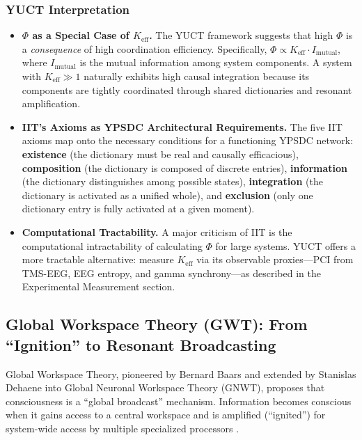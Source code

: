 \documentclass[12pt,a4paper]{article}
\begin{document}
	\subsubsection*{YUCT Interpretation}
	\begin{itemize}
		\item \textbf{\(\Phi\) as a Special Case of \(K_{\mathrm{eff}}\).} The YUCT framework suggests that high \(\Phi\) is a \textit{consequence} of high coordination efficiency. Specifically, \(\Phi \propto K_{\mathrm{eff}} \cdot I_{\text{mutual}}\), where \(I_{\text{mutual}}\) is the mutual information among system components. A system with \(K_{\mathrm{eff}} \gg 1\) naturally exhibits high causal integration because its components are tightly coordinated through shared dictionaries and resonant amplification.
		\item \textbf{IIT's Axioms as YPSDC Architectural Requirements.} The five IIT axioms map onto the necessary conditions for a functioning YPSDC network: \textbf{existence} (the dictionary must be real and causally efficacious), \textbf{composition} (the dictionary is composed of discrete entries), \textbf{information} (the dictionary distinguishes among possible states), \textbf{integration} (the dictionary is activated as a unified whole), and \textbf{exclusion} (only one dictionary entry is fully activated at a given moment).
		\item \textbf{Computational Tractability.} A major criticism of IIT is the computational intractability of calculating \(\Phi\) for large systems. YUCT offers a more tractable alternative: measure \(K_{\mathrm{eff}}\) via its observable proxies---PCI from TMS-EEG, EEG entropy, and gamma synchrony---as described in the Experimental Measurement section.
	\end{itemize}
	
	\subsection{Global Workspace Theory (GWT): From ``Ignition'' to Resonant Broadcasting}
	
	Global Workspace Theory, pioneered by Bernard Baars and extended by Stanislas Dehaene into Global Neuronal Workspace Theory (GNWT), proposes that consciousness is a ``global broadcast'' mechanism. Information becomes conscious when it gains access to a central workspace and is amplified (``ignited'') for system-wide access by multiple specialized processors \cite{Baars1988, Dehaene2014}.
	
\end{document}
